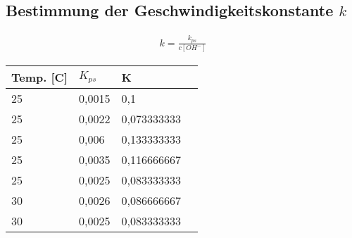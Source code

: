 \subsection{Bestimmung der Geschwindigkeitskonstante $k$}

\begin{align*}
	k = \frac{k_{ps}}{c[OH^-]}
\end{align*}

\begin{table}[H]
	\centering
	\begin{tabular}{llll}
		\toprule
		Temp. [C] & $K_{ps}$ & K           \\
		\midrule
		25        & 0,0015   & 0,1         \\
		25        & 0,0022   & 0,073333333 \\
		25        & 0,006    & 0,133333333 \\
		25        & 0,0035   & 0,116666667 \\
		25        & 0,0025   & 0,083333333 \\
		30        & 0,0026   & 0,086666667 \\
		30        & 0,0025   & 0,083333333 \\
		\bottomrule
	\end{tabular}
\end{table}
